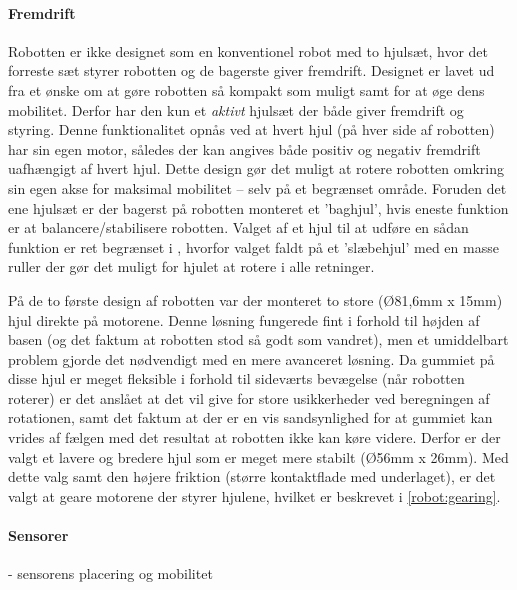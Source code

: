 \paragraph{Fremdrift}
Robotten er ikke designet som en konventionel robot med to hjulsæt, hvor det forreste sæt styrer robotten og de bagerste giver fremdrift.
Designet er lavet ud fra et ønske om at gøre robotten så kompakt som muligt samt for at øge dens mobilitet.
Derfor har den kun et \textit{aktivt} hjulsæt der både giver fremdrift og styring.
Denne funktionalitet opnås ved at hvert hjul (på hver side af robotten) har sin egen motor, således der kan angives både positiv og negativ fremdrift uafhængigt af hvert hjul.
Dette design gør det muligt at rotere robotten omkring sin egen akse for maksimal mobilitet -- selv på et begrænset område.
Foruden det ene hjulsæt er der bagerst på robotten monteret et 'baghjul', hvis eneste funktion er at balancere/stabilisere robotten.
Valget af et hjul til at udføre en sådan funktion er ret begrænset i \lego, hvorfor valget faldt på et 'slæbehjul' med en masse ruller der gør det muligt for hjulet at rotere i alle retninger.

På de to første design af robotten var der monteret to store (Ø81,6mm x 15mm) hjul direkte på motorene.
Denne løsning fungerede fint i forhold til højden af basen (og det faktum at robotten stod så godt som vandret), men et umiddelbart problem gjorde det nødvendigt med en mere avanceret løsning. 
Da gummiet på disse hjul er meget fleksible i forhold til sideværts bevægelse (når robotten roterer) er det anslået at det vil give for store usikkerheder ved beregningen af rotationen, samt det faktum at der er en vis sandsynlighed for at gummiet kan vrides af fælgen med det resultat at robotten ikke kan køre videre.
Derfor er der valgt et lavere og bredere hjul som er meget mere stabilt (Ø56mm x 26mm).
Med dette valg samt den højere friktion (større kontaktflade med underlaget), er det valgt at geare motorene der styrer hjulene, hvilket er beskrevet i \cref{robot:gearing}.

\paragraph{Sensorer}
- sensorens placering og mobilitet











